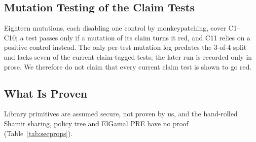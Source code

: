 \subsection{Mutation Testing of the Claim Tests}

Eighteen mutations, each disabling one control by monkeypatching, cover
C1--C10; a test passes only if a mutation of its claim turns it red, and C11
relies on a positive control instead.
The only per-test mutation log predates the 3-of-4 split and lacks seven of
the current claim-tagged tests; the later run is recorded only in prose.
We therefore do not claim that every current claim test is shown to go red.

\subsection{What Is Proven}



Library primitives are assumed secure, not proven by us, and the hand-rolled
Shamir sharing, policy tree and ElGamal PRE have no proof
(Table~\ref{tab:secprops}).
